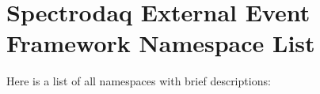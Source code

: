 \section{Spectrodaq External Event Framework Namespace List}
Here is a list of all namespaces with brief descriptions:\begin{CompactList}
\item{}
\end{CompactList}
